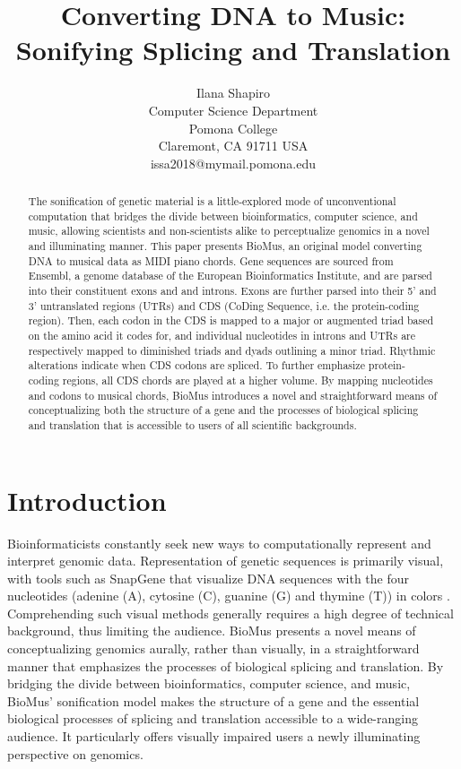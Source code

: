 \documentclass[letterpaper]{article}
\title{Converting DNA to Music: Sonifying Splicing and Translation}
\author{Ilana Shapiro\\
Computer Science Department\\
Pomona College\\
Claremont, CA 91711 USA\\
issa2018@mymail.pomona.edu\\
}
\begin{document}
 
\maketitle
\begin{abstract}
The sonification of genetic material is a little-explored mode of unconventional computation that bridges the divide between bioinformatics, computer science, and music, allowing scientists and non-scientists alike to perceptualize genomics in a novel and illuminating manner. This paper presents BioMus, an original model converting DNA to musical data as MIDI piano chords. Gene sequences are sourced from Ensembl, a genome database of the European Bioinformatics Institute, and are parsed into their constituent exons and and introns. Exons are further parsed into their 5’ and 3’ untranslated regions (UTRs) and CDS (CoDing Sequence, i.e. the protein-coding region). Then, each codon in the CDS is mapped to a major or augmented triad based on the amino acid it codes for, and individual nucleotides in introns and UTRs are respectively mapped to diminished triads and dyads outlining a minor triad. Rhythmic alterations indicate when CDS codons are spliced. To further emphasize protein- coding regions, all CDS chords are played at a higher volume. By mapping nucleotides and codons to musical chords, BioMus introduces a novel and straightforward means of conceptualizing both the structure of a gene and the processes of biological splicing and translation that is accessible to users of all scientific backgrounds.

\end{abstract}

\section{Introduction}
Bioinformaticists constantly seek new ways to computationally represent and interpret genomic data. Representation of genetic sequences is primarily visual, with tools such as SnapGene that visualize DNA sequences with the four nucleotides (adenine (A), cytosine (C), guanine (G) and thymine (T)) in colors \cite{goldstein_2023}.
Comprehending such visual methods generally requires a high degree of technical background, thus limiting the audience. BioMus presents a novel means of conceptualizing genomics aurally, rather than visually, in a straightforward manner that emphasizes the processes of biological splicing and translation. By bridging the divide between bioinformatics, computer science, and music, BioMus’ sonification model makes the structure of a gene and the essential biological processes of splicing and translation accessible to a wide-ranging audience. It particularly offers visually impaired users a newly illuminating perspective on genomics.
\end{document}
